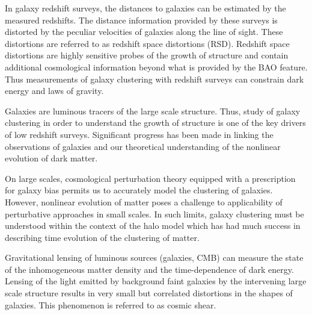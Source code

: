 In galaxy redshift surveys, the distances to galaxies can be estimated by the measured 
redshifts. The distance information provided by these surveys is distorted by the peculiar 
velocities of galaxies along the line of sight. These distortions are referred to as redshift space 
distortions (RSD). Redshift space distortions are highly sensitive probes of the growth of structure 
and contain additional cosmological information beyond what is provided by the BAO feature. 
Thus measurements of galaxy clustering with redshift surveys can 
constrain dark energy and laws of gravity.

Galaxies are luminous tracers of the large scale structure. Thus, study of galaxy clustering in order to understand the growth of structure is 
one of the key drivers of low redshift surveys. Significant progress has been made in linking the observations of 
galaxies and our theoretical understanding of the nonlinear evolution of dark matter. 

On large scales, cosmological perturbation theory equipped with a prescription for galaxy 
bias permits us to accurately model the clustering of galaxies. However, nonlinear evolution of matter 
poses a challenge to applicability of perturbative approaches in small scales. In such limits, 
galaxy clustering must be understood within the context of the halo model which has had 
much success in describing time evolution of the clustering of matter.


Gravitational lensing of luminous sources (galaxies, CMB) can measure 
the state of the inhomogeneous matter density and the time-dependence of dark energy. 
Lensing of the light emitted by background faint galaxies by the intervening large scale structure 
results in very small but correlated distortions in the shapes of galaxies. This phenomenon is referred to 
as cosmic shear.





